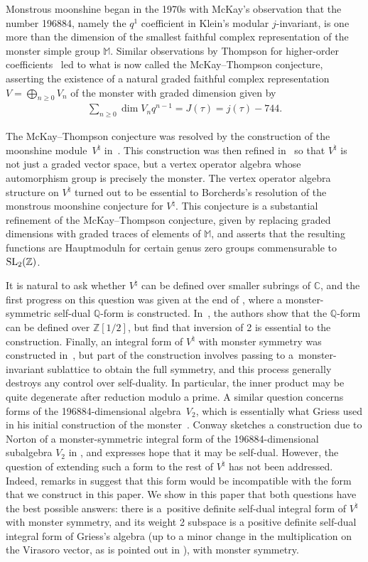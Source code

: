\documentclass[pdftex]{sigma}
\newcommand{\bC}{\mathbb{C}}
\newcommand{\bM}{\mathbb{M}}
\newcommand{\bQ}{\mathbb{Q}}
\newcommand{\bZ}{\mathbb{Z}}
\theoremstyle{definition}
\begin{document}
Monstrous moonshine began in the 1970s with McKay's observation that the number 196884, namely the $q^1$ coefficient in Klein's modular $j$-invariant, is one more than the dimension of the smallest faithful complex representation of the monster simple group $\bM$. Similar observations by Thompson for higher-order coefficients~\cite{T79} led to what is now called the McKay--Thompson conjecture, asserting the existence of a natural graded faithful complex representation $V = \bigoplus_{n \geq 0} V_n$ of the monster with graded dimension given by
\begin{gather*} \sum_{n \geq 0} \dim V_n q^{n-1} = J(\tau) = j(\tau) - 744.\end{gather*}

The McKay--Thompson conjecture was resolved by the construction of the moonshine mo\-du\-le~$V^\natural$ in~\cite{FLM85}. This construction was then refined in~\cite{FLM88} so that $V^\natural$ is not just a graded vector space, but a vertex operator algebra whose automorphism group is precisely the monster. The vertex operator algebra structure on $V^\natural$ turned out to be essential to Borcherds's resolution of the monstrous moonshine conjecture \cite{B92} for $V^\natural$. This conjecture \cite{CN79} is a substantial refinement of the McKay--Thompson conjecture, given by replacing graded dimensions with graded traces of elements of $\bM$, and asserts that the resulting functions are Hauptmoduln for certain genus zero groups commensurable to ${\rm SL}_2(\bZ)$.

It is natural to ask whether $V^\natural$ can be defined over smaller subrings of $\bC$, and the first progress on this question was given at the end of \cite{FLM88}, where a monster-symmetric self-dual $\bQ$-form is constructed. In~\cite{BR96}, the authors show that the $\bQ$-form can be defined over $\bZ[1/2]$, but find that inversion of 2 is essential to the construction. Finally, an integral form of $V^\natural$ with monster symmetry was constructed in~\cite{DG12}, but part of the construction involves passing to a~monster-invariant sublattice to obtain the full symmetry, and this process generally destroys any control over self-duality. In particular, the inner product may be quite degenerate after reduction modulo a prime. A similar question concerns forms of the 196884-dimensional algebra~$V_2$, which is essentially what Griess used in his initial construction of the monster~\cite{G82}. Conway sketches a construction due to Norton of a monster-symmetric integral form of the 196884-dimensional subalgebra $V_2$ in \cite{C85}, and expresses hope that it may be self-dual. However, the question of extending such a form to the rest of $V^\natural$ has not been addressed. Indeed, remarks in \cite{BR96} suggest that this form would be incompatible with the form that we construct in this paper. We show in this paper that both questions have the best possible answers: there is a~positive definite self-dual integral form of $V^\natural$ with monster symmetry, and its weight 2 subspace is a positive definite self-dual integral form of Griess's algebra (up to a minor change in the multiplication on the Virasoro vector, as is pointed out in \cite{FLM88}), with monster symmetry.
\end{document}
